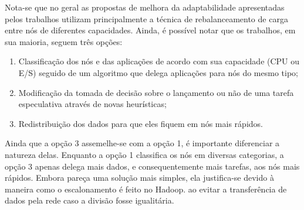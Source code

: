 
Nota-se que no geral as propostas de melhora da adaptabilidade apresentadas pelos trabalhos utilizam principalmente a técnica de rebalanceamento de carga entre nós de diferentes capacidades. Ainda, é possível notar que os trabalhos, em sua maioria, seguem três opções:

\begin{enumerate}
	\item Classificação dos nós e das aplicações de acordo com sua capacidade (CPU ou E/S) seguido de um algoritmo que delega aplicações para nós do mesmo tipo;
	\item Modificação da tomada de decisão sobre o lançamento ou não de uma tarefa especulativa através de novas heurísticas;
	\item Redistribuição dos dados para que eles fiquem em nós mais rápidos.
\end{enumerate}

Ainda que a opção 3 assemelhe-se com a opção 1, é importante diferenciar a natureza delas. Enquanto a opção 1 classifica os nós em diversas categorias, a opção 3 apenas delega mais dados, e consequentemente mais tarefas, aos nós mais rápidos. Embora pareça uma solução mais simples, ela justifica-se devido à maneira como o escalonamento é feito no Hadoop. ao evitar a transferência de dados pela rede caso a divisão fosse igualitária.

\newpage

